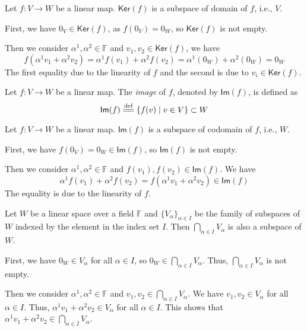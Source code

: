 \documentclass[
	11pt, %
	fleqn, %
	a4paper, %
]{LegrandOrangeBook}
\renewcommand{\ker}[1]{\mathsf{Ker}(#1)} %
\renewcommand{\Im}[1]{\mathsf{Im}(#1)} %
\newcommand{\F}{\mathbb{F}} %
\begin{document}
\begin{example}
    Let $f : V \to W$ be a linear map. $\ker f$ is a subspace of domain of $f$, i.e., $V$.
    
    First, we have $0_V \in \ker f$, as $f(0_V) = 0_W$, so $\ker f$ is not empty.

    Then we consider $\alpha^1, \alpha^2 \in \F$ and $v_1, v_2 \in \ker f$, we have
    \[
        f(\alpha^1 v_1 + \alpha^2 v_2) = \alpha^1 f(v_1) + \alpha^2 f(v_2) = \alpha^1 (0_W) + \alpha^2 (0_W) = 0_W
    \]
    The first equality due to the linearity of $f$ and the second is due to $v_i \in \ker f$.
\end{example}

\begin{definition}[Images]
    Let $f : V \to W$ be a linear map. The \emph{image} of $f$, denoted by $\Im f$, is defined as 
    \[
        \Im f \overset{\text{def}}{=\joinrel=} \{ f(v) \mid v \in V \} \subset W
    \]
\end{definition}

\begin{example}
    Let $f : V \to W$ be a linear map. $\Im f$ is a subspace of codomain of $f$, i.e., $W$.

    First, we have $f(0_V) = 0_W \in \Im f$, so $\Im f$ is not empty.

    Then we consider $\alpha^1, \alpha^2 \in \F$ and $f(v_1), f(v_2) \in \Im f$. We have 
    \[
        \alpha^1 f(v_1) + \alpha^2 f(v_2) = f(\alpha^1 v_1 + \alpha^2 v_2) \in \Im f
    \]
    The equality is due to the linearity of $f$.
\end{example}

\begin{example}
    Let $W$ be a linear space over a field $\F$ and $\{V_\alpha\}_{\alpha \in I}$ be the family of subspaces of $W$ indexed by the element in the index set $I$. Then $\bigcap_{\alpha \in I} V_\alpha$ is also a subspace of $W$.

    First, we have $0_W \in V_\alpha$ for all $\alpha \in I$, so $0_W \in \bigcap_{\alpha \in I} V_\alpha$. Thus, $\bigcap_{\alpha \in I} V_\alpha$ is not empty.

    Then we consider $\alpha^1, \alpha^2 \in \F$ and $v_1, v_2 \in \bigcap_{\alpha \in I} V_\alpha$. We have $v_1, v_2 \in V_\alpha$ for all $\alpha \in I$. Thus, $\alpha^1 v_1 + \alpha^2 v_2 \in V_\alpha$ for all $\alpha \in I$. This shows that $\alpha^1 v_1 + \alpha^2 v_2 \in \bigcap_{\alpha \in I} V_\alpha$.
\end{example}
\end{document}
